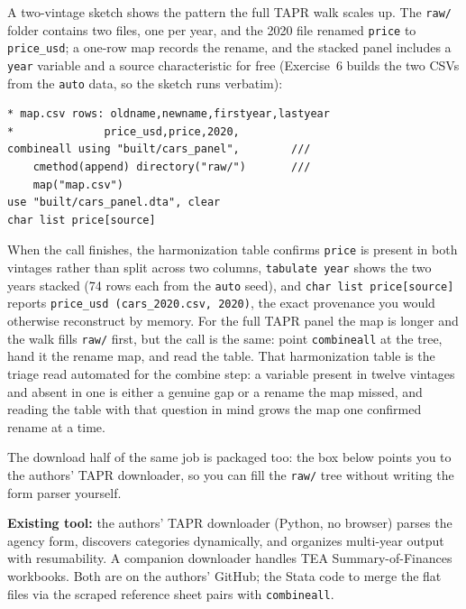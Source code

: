 A two-vintage sketch shows the pattern the full TAPR walk scales up. The \texttt{raw/} folder contains two files, one per year, and the 2020 file renamed \texttt{price} to \texttt{price\_usd}; a one-row map records the rename, and the stacked panel includes a \texttt{year} variable and a source characteristic for free (Exercise~6 builds the two CSVs from the \texttt{auto} data, so the sketch runs verbatim):
\par
{\footnotesize
\begin{verbatim}
* map.csv rows: oldname,newname,firstyear,lastyear
*              price_usd,price,2020,
combineall using "built/cars_panel",        ///
    cmethod(append) directory("raw/")       ///
    map("map.csv")
use "built/cars_panel.dta", clear
char list price[source]
\end{verbatim}
}
When the call finishes, the harmonization table confirms \texttt{price} is present in both vintages rather than split across two columns, \texttt{tabulate year} shows the two years stacked (74 rows each from the \texttt{auto} seed), and \texttt{char list price[source]} reports \texttt{price\_usd (cars\_2020.csv, 2020)}, the exact provenance you would otherwise reconstruct by memory. For the full TAPR panel the map is longer and the walk fills \texttt{raw/} first, but the call is the same: point \texttt{combineall} at the tree, hand it the rename map, and read the table. That harmonization table is the triage read automated for the combine step: a variable present in twelve vintages and absent in one is either a genuine gap or a rename the map missed, and reading the table with that question in mind grows the map one confirmed rename at a time.

The download half of the same job is packaged too: the box below points you to the authors' TAPR downloader, so you can fill the \texttt{raw/} tree without writing the form parser yourself.

\begin{kaobox}[frametitle=Package Integration: \texttt{TEA-TAPR-download}]
\textbf{Existing tool:} the authors' TAPR downloader (Python, no browser) parses the agency form, discovers categories dynamically, and organizes multi-year output with resumability. A companion downloader handles TEA Summary-of-Finances workbooks. Both are on the authors' GitHub; the Stata code to merge the flat files via the scraped reference sheet pairs with \texttt{combineall}.
\end{kaobox}

